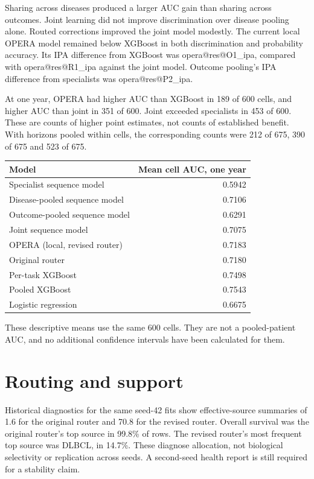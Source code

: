 \documentclass[11pt]{article}
\makeatletter
\newcommand{\result}[1]{\csname opera@res@#1\endcsname}
\makeatother
\begin{document}
Sharing across diseases produced a larger AUC gain than sharing across
outcomes. Joint learning did not improve discrimination over disease pooling
alone. Routed corrections improved the joint model modestly. The current
local OPERA model remained below XGBoost in both discrimination and
probability accuracy. Its IPA difference from XGBoost was
\result{O1_ipa}, compared with \result{R1_ipa} against the joint model.
Outcome pooling's IPA difference from specialists was \result{P2_ipa}.

At one year, OPERA had higher AUC than XGBoost in 189 of 600 cells, and
higher AUC than joint in 351 of 600. Joint exceeded specialists in 453 of
600. These are counts of higher point estimates, not counts of established
benefit. With horizons pooled within cells, the corresponding counts were
212 of 675, 390 of 675 and 523 of 675.

\begin{center}\small
\begin{tabular}{lr}\toprule
Model & Mean cell AUC, one year\\\midrule
Specialist sequence model & 0.5942\\
Disease-pooled sequence model & 0.7106\\
Outcome-pooled sequence model & 0.6291\\
Joint sequence model & 0.7075\\
OPERA (local, revised router) & 0.7183\\
Original router & 0.7180\\
Per-task XGBoost & 0.7498\\
Pooled XGBoost & 0.7543\\
Logistic regression & 0.6675\\\bottomrule
\end{tabular}\end{center}
These descriptive means use the same 600 cells. They are not a pooled-patient
AUC, and no additional confidence intervals have been calculated for them.

\section*{Routing and support}
Historical diagnostics for the same seed-42 fits show effective-source
summaries of 1.6 for the original router and 70.8 for the revised router.
Overall survival was the original router's top source in 99.8\% of rows.
The revised router's most frequent top source was DLBCL, in 14.7\%.
These diagnose allocation, not biological selectivity or replication across
seeds. A second-seed health report is still required for a stability claim.
\end{document}
